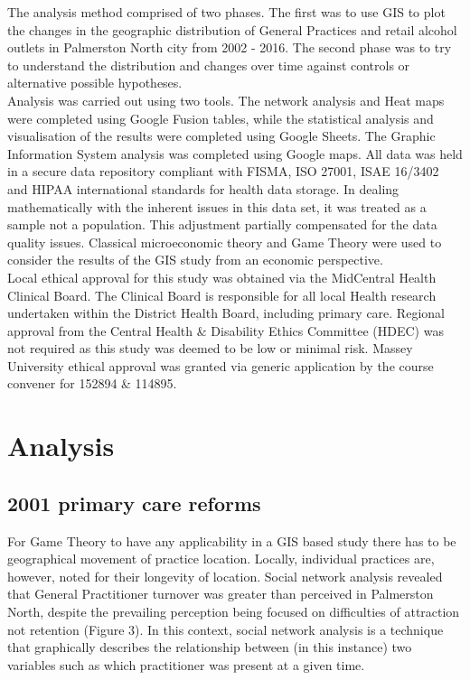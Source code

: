 \documentclass[11pt,a4paper]{article}
\begin{document}
The analysis method comprised of two phases. The first was to use GIS to plot the changes in the geographic distribution of General Practices and retail alcohol outlets in Palmerston North city from 2002 - 2016. The second phase was to try to understand the distribution and changes over time against controls or alternative possible hypotheses. \\


Analysis was carried out using two tools. The network analysis and Heat maps were completed using Google Fusion tables, while the statistical analysis and visualisation of the results were completed using Google Sheets. The Graphic Information System analysis was completed using Google maps. All data was held in a secure data repository compliant with FISMA, ISO 27001, ISAE 16/3402 and HIPAA international standards for health data storage. In dealing mathematically with the inherent issues in this data set, it was treated as a sample not a population. This adjustment partially compensated for the data quality issues. Classical microeconomic theory and Game Theory were used to consider the results of the GIS study from an economic perspective. \\


Local ethical approval for this study was obtained via the MidCentral Health Clinical Board. The Clinical Board is responsible for all local Health research undertaken within the District Health Board, including primary care.  Regional approval from the Central Health \& Disability Ethics Committee (HDEC) was not required as this study was deemed to be  low or minimal risk. Massey University ethical approval was granted via generic application by the course convener for 152894 \& 114895. \\


\section{Analysis}
\subsection{2001 primary care reforms}
For Game Theory to have any applicability in a GIS based study there has to be geographical movement of practice location. Locally, individual practices are, however,  noted for their longevity of location. Social network analysis revealed that General Practitioner turnover was greater than perceived in Palmerston North, despite the prevailing perception being focused on difficulties of attraction not retention (Figure 3). In this context, social network analysis is a technique that graphically describes the relationship between (in this instance) two variables such as which practitioner was present at a given time.\\
\end{document}
